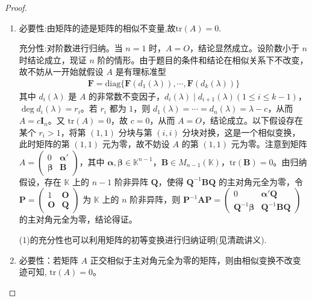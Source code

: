 \documentclass[../../main.tex]{subfiles}
\begin{document}
\begin{proof}
\begin{enumerate}[(1)]
\item 必要性:由矩阵的迹是矩阵的相似不变量,故$\mathrm{tr}(A)=0$.

充分性:对阶数进行归纳。当 $n = 1$ 时，$A = O$，结论显然成立。设阶数小于 $n$ 时结论成立，现证 $n$ 阶的情形。由于题目的条件和结论在相似关系下不改变，故不妨从一开始就假设 $A$ 是有理标准型
\begin{align*}
\boldsymbol{F}=\mathrm{diag}\{\boldsymbol{F}(d_1(\lambda)),\cdots,\boldsymbol{F}(d_k(\lambda))\}
\end{align*}
其中 $d_i(\lambda)$ 是 $A$ 的非常数不变因子，$d_i(\lambda)\mid d_{i + 1}(\lambda) (1\leqslant  i\leqslant  k - 1)$，$\deg d_i(\lambda)=r_i$。若 $r_i$ 都为 $1$，则 $d_1(\lambda)=\cdots = d_n(\lambda)=\lambda - c$，从而 $A = c\boldsymbol{I}_n$。又 $\mathrm{tr}(A)=0$，故 $c = 0$，从而 $A = O$，结论成立。以下假设存在某个 $r_i>1$，将第 $(1,1)$ 分块与第 $(i,i)$ 分块对换，这是一个相似变换，此时矩阵的第 $(1,1)$ 元为零，故不妨设 $A$ 的第 $(1,1)$ 元为零。注意到矩阵 $A=\begin{pmatrix}
0 & \boldsymbol{\alpha}' \\
\boldsymbol{\beta} & \boldsymbol{B}
\end{pmatrix}$，其中 $\boldsymbol{\alpha},\boldsymbol{\beta}\in\mathbb{K}^{n - 1}$，$\boldsymbol{B}\in M_{n - 1}(\mathbb{K})$，$\mathrm{tr}(\boldsymbol{B})=0$。由归纳假设，存在 $\mathbb{K}$ 上的 $n - 1$ 阶非异阵 $\boldsymbol{Q}$，使得 $\boldsymbol{Q}^{-1}\boldsymbol{B}\boldsymbol{Q}$ 的主对角元全为零，令 $\boldsymbol{P}=\begin{pmatrix}
1 & \boldsymbol{O} \\
\boldsymbol{O} & \boldsymbol{Q}
\end{pmatrix}$ 为 $\mathbb{K}$ 上的 $n$ 阶非异阵，则 $\boldsymbol{P}^{-1}\boldsymbol{A}\boldsymbol{P}=\begin{pmatrix}
0 & \boldsymbol{\alpha}'\boldsymbol{Q} \\
\boldsymbol{Q}^{-1}\boldsymbol{\beta} & \boldsymbol{Q}^{-1}\boldsymbol{B}\boldsymbol{Q}
\end{pmatrix}$ 的主对角元全为零，结论得证。

\begin{remark}
(1)的充分性也可以利用矩阵的初等变换进行归纳证明(见清疏讲义).
\end{remark}

\item 必要性：若矩阵 \( A \) 正交相似于主对角元全为零的矩阵，则由相似变换不改变迹可知, \(\mathrm{tr}(A) = 0\)。


\end{enumerate}
\end{proof}
\end{document}
